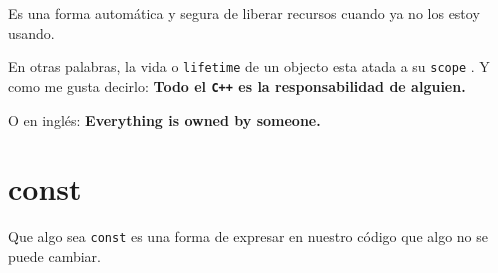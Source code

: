 \documentclass[12pt, fleqn]{report}                             %
\theoremstyle{break}                                            %
\newcommand{\textCode}[1]  { \texttt{#1} }                      %
\newcommand{\Cpp}{\ignorespaces\textCode{C++}}                  %
\begin{document}
            Es una forma automática y segura de liberar recursos cuando ya no los estoy usando.

            En otras palabras, la vida o \textCode{lifetime} de un objecto esta atada a su \textCode{scope}.
            Y como me gusta decirlo:
            \textbf{
                Todo el \Cpp es la responsabilidad de alguien.
            }

            O en inglés:
            \textbf{
                Everything is owned by someone.
            }

            \cite{ModernCppWhatYouNeedToKnow}



        \clearpage
        \section{const}


            Que algo sea \textCode{const} es una forma de expresar en nuestro código que
            algo no se puede cambiar.
            
\end{document}
